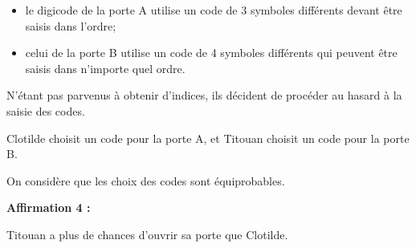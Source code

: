 \begin{enumerate}[itemsep=1cm]
		\begin{itemize}[label={\textbullet~}]
			\item le digicode de la porte A utilise un code de 3 symboles différents devant être saisis dans l'ordre;
			\item celui de la porte B utilise un code de 4 symboles différents qui peuvent être saisis dans n'importe quel ordre.
		\end{itemize}

		N'étant pas parvenus à obtenir d'indices, ils décident de procéder au hasard à la saisie des codes.

		Clotilde choisit un code pour la porte A, et Titouan choisit un code pour la porte B.

		On considère que les choix des codes sont équiprobables.

		\textbf{Affirmation 4 :}

		Titouan a plus de chances d'ouvrir sa porte que Clotilde.
	\end{enumerate}
